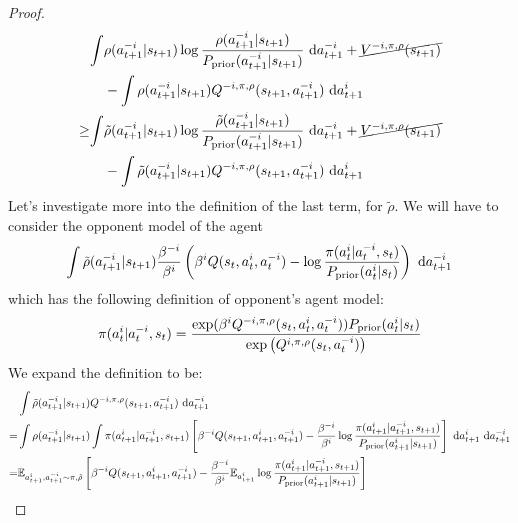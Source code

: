 \begin{proof}
\begin{equation*}
\begin{aligned}
&\begin{aligned}[t]
    \int &\rho(a^{-i}_{t+1} | s_{t+1}) \log\frac{\rho(a^{-i}_{t+1} | s_{t+1})}{P_{\text{prior}}(a^{-i}_{t+1} | s_{t+1})} \ \mathrm{d} a^{-i}_{t+1} + \cancel{V^{-i, \pi, \rho}(s_{t+1})} \\
    &- \int \rho(a^{-i}_{t+1} | s_{t+1}) Q^{-i, \pi, \rho}(s_{t+1}, a^{-i}_{t+1}) \ \mathrm{d} a^{i}_{t+1}
\end{aligned} \\
\ge&\begin{aligned}[t]
    \int &\tilde{\rho}(a^{-i}_{t+1} | s_{t+1}) \log\frac{\tilde{\rho}(a^{-i}_{t+1} | s_{t+1})}{P_{\text{prior}}(a^{-i}_{t+1} | s_{t+1})} \ \mathrm{d} a^{-i}_{t+1} + \cancel{V^{-i, \pi, \rho}(s_{t+1})} \\
    &- \int \tilde{\rho}(a^{-i}_{t+1} | s_{t+1}) Q^{-i, \pi, \rho}(s_{t+1}, a^{-i}_{t+1}) \ \mathrm{d} a^{i}_{t+1}
\end{aligned}
\end{aligned}
\end{equation*}
Let's investigate more into the definition of the last term, for $\tilde{\rho}$. We will have to consider the opponent model of the agent
\begin{equation}
    \int \tilde{\rho}(a^{-i}_{t+1} | s_{t+1}) \frac{\beta^{-i}}{\beta^{i}} \left( \beta^iQ(s_t, a^i_t, a^{-i}_t) - \log \frac{\pi(a^i_t | a^{-i}_t, s_t)}{P_{\text{prior}}(a^i_t | s_t)} \right) \ \mathrm{d} a^{-i}_{t+1}
\end{equation}
which has the following definition of opponent's agent model:
\begin{equation*}
    \pi(a^i_t | a^{-i}_t, s_t) = \frac{\exp(\beta^i Q^{-i, \pi, \rho}(s_t, a^i_t, a^{-i}_t)) P_{\text{prior}}(a^i_t | s_t)}{\exp\left( Q^{i, \pi, \rho}(s_t, a^{-i}_t) \right)}
\end{equation*}
We expand the definition to be:
\begin{equation*}
\begin{aligned}
    &\int \tilde{\rho}(a^{-i}_{t+1} | s_{t+1}) Q^{-i, \pi, \rho}(s_{t+1}, a^{-i}_{t+1}) \dby a^{-i}_{t+1} \\
    =& \int \rho(a^{-i}_{t+1} | s_{t+1}) \int \pi(a^i_{t+1} | a^{-i}_{t+1}, s_{t+1}) \brackb{\beta^{-i}Q(s_{t+1}, a^i_{t+1}, a^{-i}_{t+1}) - \frac{\beta^{-i}}{\beta^{i}}\log \frac{\pi(a^i_{t+1} | a^{-i}_{t+1}, s_{t+1})}{P_\prior(a^i_{t+1} | s_{t+1})}} \dby a^{i}_{t+1} \dby a^{-i}_{t+1} \\
    =& \mathbb{E}_{a^i_{t+1}, a^{-i}_{t+1} \sim \pi, \tilde{\rho}} \brackb{\beta^{-i}Q(s_{t+1}, a^i_{t+1}, a^{-i}_{t+1}) - \frac{\beta^{-i}}{\beta^i} \mathbb{E}_{a^i_{t+1}}\log \frac{\pi(a^i_{t+1} | a^{-i}_{t+1}, s_{t+1})}{P_\prior(a^i_{t+1} | s_{t+1})}}

\end{aligned}
\end{equation*}
\end{proof}
